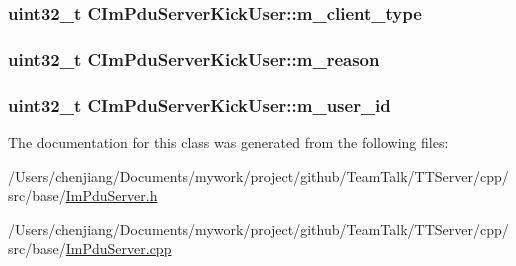 \subsubsection[{m\+\_\+client\+\_\+type}]{\setlength{\rightskip}{0pt plus 5cm}uint32\+\_\+t C\+Im\+Pdu\+Server\+Kick\+User\+::m\+\_\+client\+\_\+type\hspace{0.3cm}{\ttfamily [private]}}\label{class_c_im_pdu_server_kick_user_ac70c6f712f4a26e575ee642f820f9e18}
\hypertarget{class_c_im_pdu_server_kick_user_a089ca855ae3af39890101f099f96cce8}{}
\subsubsection[{m\+\_\+reason}]{\setlength{\rightskip}{0pt plus 5cm}uint32\+\_\+t C\+Im\+Pdu\+Server\+Kick\+User\+::m\+\_\+reason\hspace{0.3cm}{\ttfamily [private]}}\label{class_c_im_pdu_server_kick_user_a089ca855ae3af39890101f099f96cce8}
\hypertarget{class_c_im_pdu_server_kick_user_a22a63c8e4474d983eab1e01dbbbb27ea}{}
\subsubsection[{m\+\_\+user\+\_\+id}]{\setlength{\rightskip}{0pt plus 5cm}uint32\+\_\+t C\+Im\+Pdu\+Server\+Kick\+User\+::m\+\_\+user\+\_\+id\hspace{0.3cm}{\ttfamily [private]}}\label{class_c_im_pdu_server_kick_user_a22a63c8e4474d983eab1e01dbbbb27ea}


The documentation for this class was generated from the following files\+:\begin{DoxyCompactItemize}
\item 
/\+Users/chenjiang/\+Documents/mywork/project/github/\+Team\+Talk/\+T\+T\+Server/cpp/src/base/\hyperlink{_im_pdu_server_8h}{Im\+Pdu\+Server.\+h}\item 
/\+Users/chenjiang/\+Documents/mywork/project/github/\+Team\+Talk/\+T\+T\+Server/cpp/src/base/\hyperlink{_im_pdu_server_8cpp}{Im\+Pdu\+Server.\+cpp}\end{DoxyCompactItemize}
